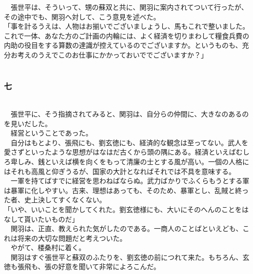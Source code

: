 \documentclass[
  paper=a5,
  fontsize=10pt,
  jafontsize=9.5pt,
  tate,                  %
  open_bracket_pos=nibu, %
]{jlreq}
\begin{document}
　張世平は、そういって、甥の蘇双と共に、関羽に案内されてついて行ったが、その途中でも、関羽へ対して、こう意見を述べた。\\


「事を計るうえは、人物はお揃いでございましょうし、馬もこれで整いました。これで一体、あなた方のご計画の内輪には、よく経済を切りまわして糧食兵費の内助の役目をする算数の達識が控えているのでございますか。というものも、充分お考えのうえでこのお仕事にかかっておいででございますか？」\\

\\

\subsubsection{七}

\\


　張世平に、そう指摘されてみると、関羽は、自分らの仲間に、大きなのあるのを見いだした。\\


　経営ということであった。\\


　自分はもとより、張飛にも、劉玄徳にも、経済的な観念は至ってない。武人を愛さずといったような思想がはなはだ古くから頭の隅にある。経済といえばむしろ卑しみ、銭といえば横を向くをもって清廉の士とする風が高い。一個の人格にはそれも高風と仰ぎうるが、国家の大計となればそれでは不具を意味する。\\


　一軍を持てばすでに経営を思わねばならぬ。武力ばかりでふくらもうとする軍は暴軍に化しやすい。古来、理想はあっても、そのため、暴軍とし、乱賊と終った者、史上決してすくなくない。\\


「いや、いいことを聞かしてくれた。劉玄徳様にも、大いにそのへんのことをはなして貰いたいものだ」\\


　関羽は、正直、教えられた気がしたのである。一商人のことばといえども、これは将来の大切な問題だと考えついた。\\


　やがて、楼桑村に着く。\\


　関羽はすぐ張世平と蘇双のふたりを、劉玄徳の前につれて来た。もちろん、玄徳も張飛も、張の好意を聞いて非常によろこんだ。\\
\end{document}
